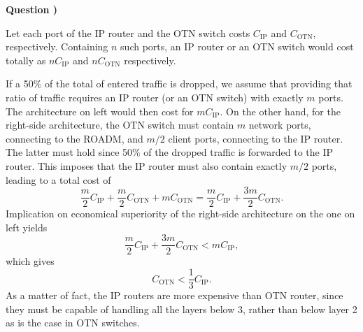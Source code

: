 \documentclass[a4paper]{article}
\newcounter{QuestionNumber}
\newcommand{\Q}{
\textbf{Question \theQuestionNumber)}
\stepcounter{QuestionNumber}
}
\begin{document}
\Q


Let each port of the IP router and the OTN switch costs $C_\text{IP}$ and $C_\text{OTN}$, respectively. Containing $n$ such ports, an IP router or an OTN switch would cost totally as $nC_\text{IP}$ and $nC_\text{OTN}$ respectively.

If a 50\% of the total of entered traffic is dropped, we assume that providing that ratio of traffic requires an IP router (or an OTN switch) with exactly $m$ ports. The architecture on left would then cost for $mC_\text{IP}$. On the other hand, for the right-side architecture, the OTN switch must contain $m$ network ports, connecting to the ROADM, and $m/2$ client ports, connecting to the IP router. The latter must hold since 50\% of the dropped traffic is forwarded to the IP router. This imposes that the IP router must also contain exactly $m/2$ ports, leading to a total cost of
$$
\frac{m}{2}C_\text{IP}+\frac{m}{2}C_\text{OTN}+mC_\text{OTN}
=\frac{m}{2}C_\text{IP}+\frac{3m}{2}C_\text{OTN}.
$$
Implication on economical superiority of the right-side architecture on the one on left yields
$$
\frac{m}{2}C_\text{IP}+\frac{3m}{2}C_\text{OTN}<mC_\text{IP},
$$
which gives
$$
C_\text{OTN}<\frac{1}{3}C_\text{IP}.
$$
As a matter of fact, the IP routers are more expensive than OTN router, since they must be capable of handling all the layers below 3, rather than below layer 2 as is the case in OTN switches.


\end{document}
